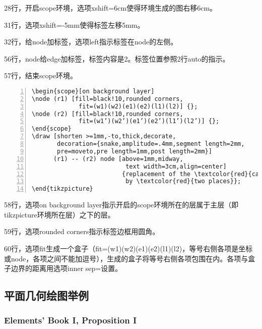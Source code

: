 \documentclass[UTF8]{ctexart}
\begin{document}
28行，开启scope环境，选项xshift=6cm使得环境生成的图右移6cm。

31行，选项xshift=-5mm使得标签左移5mm。

32行，给node加标签，选项left指示标签在node的左侧。

56行，node给edge加标签，标签内容是2。标签位置参照2行auto的指示。

57行，结束scope环境。

\begin{lstlisting}[name=example-2,numbers=left,    numberstyle=\footnotesize]
\begin{scope}[on background layer]
\node (r1) [fill=black!10,rounded corners,
             fit=(w1)(w2)(e1)(e2)(l1)(l2)] {};
\node (r2) [fill=black!10,rounded corners,
             fit=(w1’)(w2’)(e1’)(e2’)(l1’)(l2’)] {};
\end{scope}
\draw [shorten >=1mm,-to,thick,decorate,
       decoration={snake,amplitude=.4mm,segment length=2mm,
       pre=moveto,pre length=1mm,post length=2mm}]
      (r1) -- (r2) node [above=1mm,midway,
                          text width=3cm,align=center]
                         {replacement of the \textcolor{red}{capacity} 
                          by \textcolor{red}{two places}};
\end{tikzpicture}
\end{lstlisting}

58行，选项on background layer指示开启的scope环境所在的层属于主层（即tikzpicture环境所在层）之下的层。

59行，选项rounded corners指示标签边框用圆角。

60行，选项fit生成一个盒子（fit=(w1)(w2)(e1)(e2)(l1)(l2)，等号右侧各项是坐标或node，各项之间不能加逗号），生成的盒子将等号右侧各项包围在内。各项与盒子边界的距离用选项inner sep=设置。



\subsection{平面几何绘图举例}

\subsubsection{Elements' Book I, Proposition I}
\end{document}
